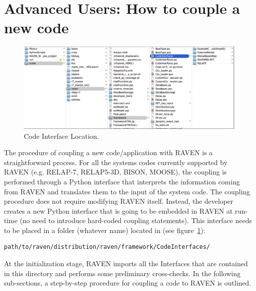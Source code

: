 \section{Advanced Users: How to couple a new code}
\label{sec:newCodeCoupling}
\begin{figure}
\centering
\includegraphics[width=1.0\textwidth]{pics/CodeInterfaceLocation.png}
\caption{Code Interface Location.}
\label{fig:codeinterface}
\end{figure}
The procedure of coupling a new code/application with RAVEN is a straightforward process. 
For all the systems codes currently supported by RAVEN (e.g. RELAP-7, RELAP5-3D, 
BISON, MOOSE), the coupling is performed through a Python interface that interprets the information coming from RAVEN and translates them to the
  input of the system code. 
The coupling procedure does not require modifying RAVEN itself. Instead, the developer creates a new Python interface that is going to be embedded 
 in RAVEN at run-time (no need to introduce  hard-coded coupling statements). 
 This interface needs to be placed in a folder (whatever name) located in (see figure~\ref{fig:codeinterface}):
\begin{lstlisting}[language=bash]
 path/to/raven/distribution/raven/framework/CodeInterfaces/
\end{lstlisting}
At the initialization stage, RAVEN imports all the Interfaces that are contained in this directory and performs some preliminary cross-checks.
In the following sub-sections, a step-by-step procedure for coupling a code to RAVEN is outlined.
